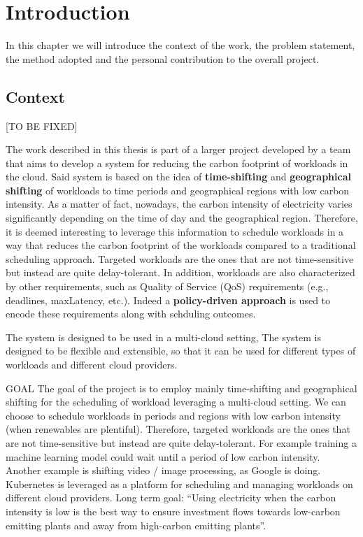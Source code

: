 \chapter{Introduction}
\label{cha:introduction}

In this chapter we will introduce the context of the work, the problem statement, the method adopted and the personal contribution to the overall project.

\section{Context}
\label{sec:context}

[TO BE FIXED] \newline

The work described in this thesis is part of a larger project developed by a team
that aims to develop a system for reducing the carbon footprint of workloads in the cloud. 
Said system is based on the idea of \textbf{time-shifting} and \textbf{geographical shifting} of workloads to time periods and geographical regions with low carbon intensity.
As a matter of fact, nowadays, the carbon intensity of electricity varies significantly depending on the time of day and the geographical region.
Therefore, it is deemed interesting to leverage this information to schedule workloads in a way that reduces the carbon footprint of the workloads compared to a traditional scheduling approach.
Targeted workloads are the ones that are not time-sensitive but instead are quite delay-tolerant. 
In addition, workloads are also characterized by other requirements, such as Quality of Service (QoS) requirements (e.g., deadlines, maxLatency, etc.).
Indeed a \textbf{policy-driven approach} is used to encode these requirements along with schduling outcomes.


The system is designed to be used in a multi-cloud setting, 
The system is designed to be flexible and extensible, so that it can be used for different types of workloads and different cloud providers.

GOAL
The goal of the project is to employ mainly time-shifting and geographical shifting for the scheduling of workload leveraging a multi-cloud setting.
We can choose to schedule workloads in periods and regions with low carbon intensity (when renewables are plentiful). 
Therefore, targeted workloads are the ones that are not time-sensitive but instead are quite delay-tolerant. For example training a machine learning model could wait until a period of low carbon intensity. Another example is shifting video / image processing, as Google is doing.
Kubernetes is leveraged as a platform for scheduling and managing workloads on different cloud providers.
Long term goal: “Using electricity when the carbon intensity is low is the best way to ensure investment flows towards low-carbon emitting plants and away from high-carbon emitting plants”.


